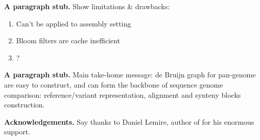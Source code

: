 \documentclass{llncs}
\newcommand{\stub}{\textbf{A paragraph stub. }}
\begin{document}
\stub Show limitations \& drawbacks:
\begin{enumerate}
	\item Can't be applied to assembly setting
	\item Bloom filters are cache inefficient 
	\item ?
\end{enumerate}

\stub Main take-home message: de Bruijn graph for pan-genome are easy to construct, and can form the backbone of sequence genome comparison:
reference/variant representation, alignment and synteny blocks construction.

\textbf{Acknowledgements.} Say thanks to Daniel Lemire, author of \cite{lemire2010recursive} for his enormous support.



\end{document}
